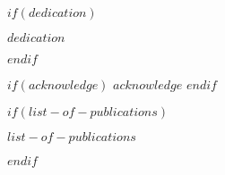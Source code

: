 \documentclass[11pt, a4paper, twosided]{book}
\newcommand{\thesisauthor}{$author$}
\newcommand{\thesisdate}{$date$}
\begin{document}
\newpage
\thispagestyle{empty}
%
%
%
%

\pagestyle{empty} %





$if(dedication)$
\vspace*{\fill}
\begin{center}
\textit{$dedication$}
\end{center}
\vspace*{\fill}
\newpage\null\thispagestyle{empty}\newpage
$endif$

\pagestyle{plain}
\setcounter{page}{1}    %
$if(acknowledge)$
\newpage
$acknowledge$
\newpage\null\newpage
$endif$


$if(list-of-publications)$
\begin{sloppypar}
    $list-of-publications$
\end{sloppypar}
\newpage\null\newpage
$endif$
\end{document}
